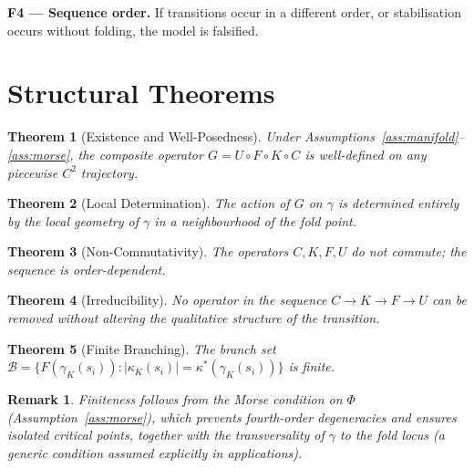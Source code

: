 \documentclass[12pt,a4paper]{article}
\newtheorem{theorem}{Theorem}[section]
\newtheorem{remark}{Remark}[section]
\begin{document}
\textbf{F4 --- Sequence order.}
If transitions occur in a different order, or stabilisation occurs
without folding, the model is falsified.

\section{Structural Theorems}
\label{sec:theorems}

\begin{theorem}[Existence and Well-Posedness]
\label{thm:existence}
Under Assumptions~\ref{ass:manifold}--\ref{ass:morse}, the composite
operator $G = U \circ F \circ K \circ C$ is well-defined on any
piecewise $C^2$ trajectory.
\end{theorem}

\begin{theorem}[Local Determination]
\label{thm:local}
The action of $G$ on $\gamma$ is determined entirely by the local
geometry of $\gamma$ in a neighbourhood of the fold point.
\end{theorem}

\begin{theorem}[Non-Commutativity]
\label{thm:noncomm}
The operators $C, K, F, U$ do not commute; the sequence is
order-dependent.
\end{theorem}

\begin{theorem}[Irreducibility]
\label{thm:irred}
No operator in the sequence $C \to K \to F \to U$ can be removed
without altering the qualitative structure of the transition.
\end{theorem}

\begin{theorem}[Finite Branching]
\label{thm:finite}
The branch set
$\mathcal{B} = \{F(\gamma_K(s_i)) : |\kappa_K(s_i)| = \kappa^*(\gamma_K(s_i))\}$
is finite.
\end{theorem}

\begin{remark}
Finiteness follows from the Morse condition on $\Phi$
(Assumption~\ref{ass:morse}), which prevents fourth-order degeneracies
and ensures isolated critical points, together with the transversality
of $\gamma$ to the fold locus (a generic condition assumed explicitly
in applications).
\end{remark}

\end{document}
